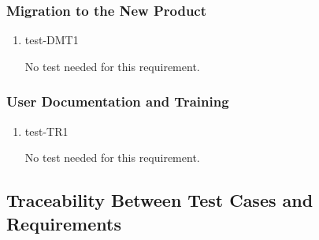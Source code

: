 \documentclass[12pt, titlepage]{article}
\begin{document}








\subsubsection{Migration to the New Product}

\begin{enumerate}

  \item{test-DMT1\\}
  
  No test needed for this requirement.

\end{enumerate}

\subsubsection{User Documentation and Training}

\begin{enumerate}

  \item{test-TR1\\}

  No test needed for this requirement.

\end{enumerate}

\subsection{Traceability Between Test Cases and Requirements}
\end{document}
